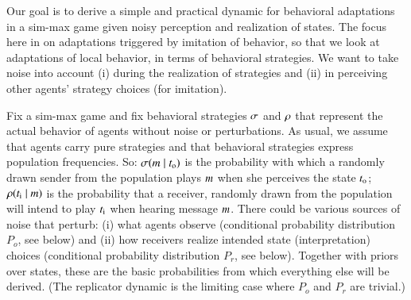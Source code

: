 \documentclass[fleqn,reqno,11pt]{article}
\begin{document}
Our goal is to derive a simple and practical dynamic for behavioral adaptations in a sim-max
game given noisy perception and realization of states. The focus here in on adaptations
triggered by imitation of behavior, so that we look at adaptations of local behavior, in terms
of behavioral strategies. We want to take noise into account (i) during the realization of
strategies and (ii) in perceiving other agents' strategy choices (for imitation).

Fix a sim-max game and fix behavioral strategies $\sigma$ and $\rho$ that represent the
actual behavior of agents without noise or perturbations. As usual, we assume that agents carry
pure strategies and that behavioral strategies express population frequencies. So:
$\sigma(m \mid t_{\mathrm{o}})$ is the probability with which a randomly drawn sender
from the population plays $m$ when she perceives the state $t_{\mathrm{o}}$;
$\rho(t_{\mathrm{i}} \mid m)$ is the probability that a receiver, randomly drawn from
the population will intend to play $t_{\mathrm{i}}$ when hearing message $m$. There could be
various sources of noise that perturb: (i) what agents observe (conditional probability
distribution $P_o$, see below) and (ii) how receivers realize intended state (interpretation)
choices (conditional probability distribution $P_r$, see below). Together with priors over
states, these are the basic probabilities from which everything else will be derived. (The
replicator dynamic is the limiting case where $P_o$ and $P_r$ are trivial.)
\end{document}
